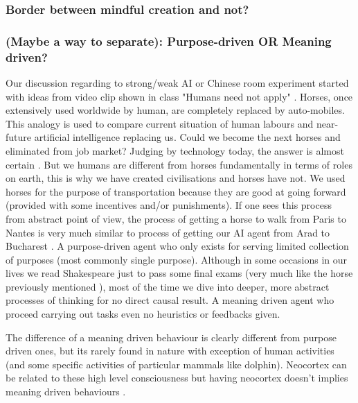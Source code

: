 \documentclass[11pt]{article}
\begin{document}
\subsubsection*{Border between mindful creation and not?}


\subsubsection*{(Maybe a way to separate): Purpose-driven OR Meaning driven?}
 
Our discussion regarding to strong/weak AI or Chinese room experiment started with ideas from video clip shown in class "Humans need not apply" \cite{grey2014humans}. Horses, once extensively used worldwide by human, are completely replaced by auto-mobiles. This analogy is used to compare current situation of human labours and near-future artificial intelligence replacing us. Could we become the next horses and eliminated from job market? Judging by technology today, the answer is almost certain . But we humans are different from horses fundamentally in terms of roles on earth, this is why we have created civilisations and horses have not. We used horses for the purpose of transportation because they are good at going forward (provided with some incentives and/or punishments). If one sees this process from abstract point of view, the process of getting a horse to walk from Paris to Nantes is very much similar to process of getting our AI agent from Arad to Bucharest . A purpose-driven agent who only exists for serving limited collection of purposes (most commonly single purpose). Although in some occasions in our lives we read Shakespeare just to pass some final exams (very much like the horse previously mentioned ), most of the time we dive into deeper, more abstract processes of thinking for no direct causal result. A meaning driven agent who proceed carrying out tasks even no heuristics or feedbacks given. 

The difference of a meaning driven behaviour is clearly different from purpose driven ones, but its rarely found in nature with exception of human activities (and some specific activities of particular mammals like dolphin). Neocortex can be related to these high level consciousness but having neocortex doesn't implies meaning driven behaviours . 
\end{document}

